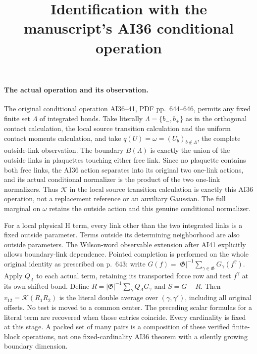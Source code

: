 \documentclass[11pt]{article}
\title{Identification with the manuscript's AI36 conditional operation}\author{}\date{}
\begin{document}
\maketitle
\paragraph{The actual operation and its observation.}
The original conditional operation AI36--41, PDF pp.~644--646, permits any fixed finite set
$\Lambda$ of integrated bonds. Take literally $\Lambda=\{b_-,b_+\}$ as in the orthogonal contact calculation, the local source transition calculation and the uniform contact moments calculation,
and take $q(U)=\omega=(U_b)_{b\notin\Lambda}$, the complete outside-link observation.
The boundary $B(\Lambda)$ is exactly the union of the outside links in plaquettes touching
either free link. Since no plaquette contains both free links, the AI36 action separates
into its original two one-link actions, and its actual conditional normalizer is the product
of the two one-link normalizers. Thus $\mathcal K$ in the local source transition calculation is exactly this AI36 operation,
not a replacement reference or an auxiliary Gaussian. The full marginal on $\omega$
retains the outside action and this genuine conditional normalizer.

For a local physical H term, every link other than the two integrated links is a fixed outside
parameter. Terms outside its determining neighborhood are also outside parameters.
The Wilson-word observable extension after AI41 explicitly allows boundary-link dependence.
Pointed completion is performed on the whole original identity as prescribed on p.~643:
write $G(f)=|\mathfrak G|^{-1}\sum_{\gamma\in\mathfrak G}G_\gamma(f^\gamma)$.
Apply $Q_\Lambda$ to each actual term, retaining its transported force row and test
$f^\gamma$ at its own shifted bond. Define $R=|\mathfrak G|^{-1}\sum_\gamma Q_\Lambda G_\gamma$
and $S=G-R$. Then $v_{12}=\mathcal K(R_1R_2)$ is the literal double average over
$(\gamma,\gamma')$, including all original offsets. No test is moved to a common center.
The preceding scalar formulas for a literal term are recovered when those entries coincide.
Every cardinality is fixed at this stage. A packed set of many pairs is a composition of
these verified finite-block operations, not one fixed-cardinality AI36 theorem with a
silently growing boundary dimension.
\end{document}
